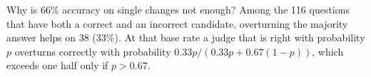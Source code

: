 \documentclass[11pt]{article}
\begin{document}
Why is 66\% accuracy on single changes not enough?
Among the 116 questions that have both a correct and an incorrect candidate, overturning the majority answer helps on 38 (33\%).
At that base rate a judge that is right with probability $p$ overturns correctly with probability $0.33p/(0.33p+0.67(1-p))$, which exceeds one half only if $p>0.67$.
\end{document}
